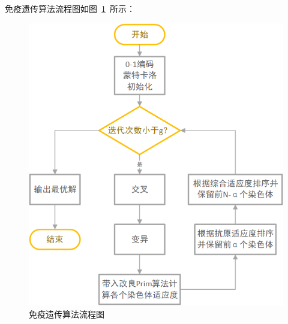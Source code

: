 \documentclass{whutmod}
\begin{document}
	  \newpage
	  免疫遗传算法流程图如图~\ref{bgrs}~所示：
	  \begin{figure}[H]
		\centering
	
		 \includegraphics[width=.8\textwidth]{figures/a31.png}
		 \caption{	免疫遗传算法流程图}\label{bgrs}
	 \end{figure}
\newpage
\end{document}
